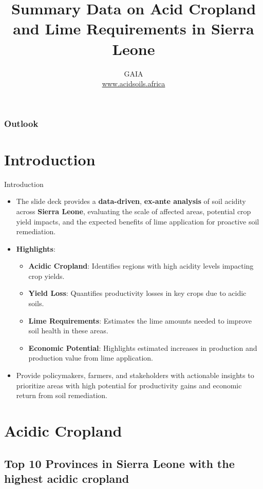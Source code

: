 \documentclass[xcolor=table, aspectratio=1610]{beamer}
\title[Sierra Leone--Summary]{\textsf{Summary Data on Acid Cropland and Lime Requirements in Sierra Leone}}
\author[GAIA]{GAIA\\ \href{www.acidsoils.africa}{www.acidsoils.africa} }
\institute[CIMMYT]
\begin{document}
\begin{frame}[plain]
\textsc{\titlepage}
\end{frame}

\begin{frame}
\frametitle{Outlook}
\tableofcontents 
\end{frame}

\section{Introduction}
\begin{frame}{Introduction}
    \begin{itemize}
        \item The slide deck provides a \textbf{data-driven}, \textbf{ex-ante analysis} of soil acidity across \textbf{Sierra Leone}, evaluating the scale of affected areas, potential crop yield impacts, and the expected benefits of lime application for proactive soil remediation.
        \bigskip
        \item \textbf{Highlights}:
        \begin{itemize}
            \item \textbf{Acidic Cropland}: Identifies regions with high acidity levels impacting crop yields.
            \item \textbf{Yield Loss}: Quantifies productivity losses in key crops due to acidic soils.
            \item \textbf{Lime Requirements}: Estimates the lime amounts needed to improve soil health in these areas.
            \item \textbf{Economic Potential}: Highlights estimated increases in production and production value from lime application.
        \end{itemize}
        \bigskip
        \item Provide policymakers, farmers, and stakeholders with actionable insights to prioritize areas with high potential for productivity gains and economic return from soil remediation.
    \end{itemize}
\end{frame}
\section{Acidic Cropland}
\subsection*{Top 10 Provinces in Sierra Leone with the highest acidic cropland}
\end{document}
